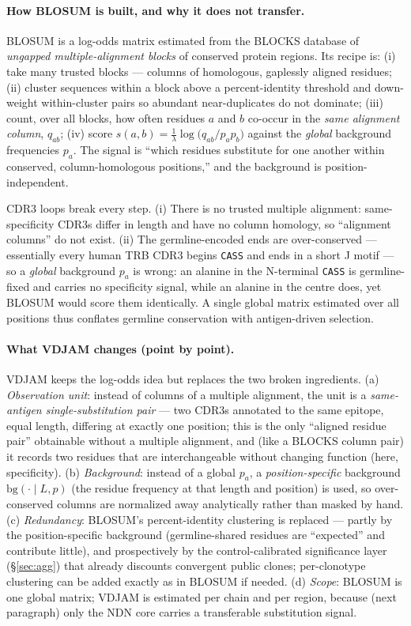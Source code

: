 \documentclass[11pt]{article}
\theoremstyle{oldplain}
\theoremstyle{oldrem}
\begin{document}
\paragraph{How BLOSUM is built, and why it does not transfer.} BLOSUM is a log-odds matrix estimated
from the BLOCKS database of \emph{ungapped multiple-alignment blocks} of conserved protein regions. Its
recipe is: (i) take many trusted blocks --- columns of homologous, gaplessly aligned residues; (ii)
cluster sequences within a block above a percent-identity threshold and down-weight within-cluster pairs
so abundant near-duplicates do not dominate; (iii) count, over all blocks, how often residues $a$ and
$b$ co-occur in the \emph{same alignment column}, $q_{ab}$; (iv) score
$s(a,b)=\tfrac1\lambda\log\!\big(q_{ab}/p_ap_b\big)$ against the \emph{global} background frequencies
$p_a$. The signal is ``which residues substitute for one another within conserved, column-homologous
positions,'' and the background is position-independent.

CDR3 loops break every step. (i) There is no trusted multiple alignment: same-specificity CDR3s differ
in length and have no column homology, so ``alignment columns'' do not exist. (ii) The germline-encoded
ends are over-conserved --- essentially every human TRB CDR3 begins \texttt{CASS} and ends in a short J
motif --- so a \emph{global} background $p_a$ is wrong: an alanine in the N-terminal \texttt{CASS} is
germline-fixed and carries no specificity signal, while an alanine in the centre does, yet BLOSUM would
score them identically. A single global matrix estimated over all positions thus conflates germline
conservation with antigen-driven selection.

\paragraph{What VDJAM changes (point by point).} VDJAM keeps the log-odds idea but replaces the two
broken ingredients. (a) \emph{Observation unit}: instead of columns of a multiple alignment, the unit is
a \emph{same-antigen single-substitution pair} --- two CDR3s annotated to the same epitope, equal length,
differing at exactly one position; this is the only ``aligned residue pair'' obtainable without a
multiple alignment, and (like a BLOCKS column pair) it records two residues that are interchangeable
without changing function (here, specificity). (b) \emph{Background}: instead of a global $p_a$, a
\emph{position-specific} background $\mathrm{bg}(\cdot\mid L,p)$ (the residue frequency at that length and
position) is used, so over-conserved columns are normalized away analytically rather than masked by hand.
(c) \emph{Redundancy}: BLOSUM's percent-identity clustering is replaced --- partly by the position-specific
background (germline-shared residues are ``expected'' and contribute little), and prospectively by the
control-calibrated significance layer (\S\ref{sec:agg}) that already discounts convergent public clones;
per-clonotype clustering can be added exactly as in BLOSUM if needed. (d) \emph{Scope}: BLOSUM is one
global matrix; VDJAM is estimated per chain and per region, because (next paragraph) only the NDN core
carries a transferable substitution signal.
\end{document}
